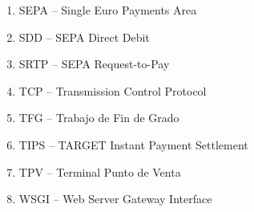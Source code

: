 \documentclass{book}
\begin{document}
\begin{acronym}[SRTP]
\begin{enumerate}
  \item SEPA – Single Euro Payments Area
  \item SDD – SEPA Direct Debit
  \item SRTP – SEPA Request-to-Pay
  \item TCP – Transmission Control Protocol
  \item TFG – Trabajo de Fin de Grado
  \item TIPS – TARGET Instant Payment Settlement
  \item TPV – Terminal Punto de Venta
  \item WSGI – Web Server Gateway Interface
\end{enumerate}
\end{acronym}


\mainmatter

\newpage




\newpage




\newpage



\newpage




\newpage




\newpage



\newpage

\newpage
\clearpage




\newpage

\backmatter


\newpage
\renewcommand{\listfigurename}{Índice de Figuras}
\listoffigures
{}

\newpage
\renewcommand{\listtablename}{Índice de Tablas}
\listoftables
{}

\newpage
\renewcommand*{\lstlistlistingname}{Índice de Listados}
\renewcommand*{\lstlistingname}{Código}
\lstlistoflistings
{}

\clearpage
\nocite{*}
\printbibliography[title={Bibliografía}]
\end{document}
